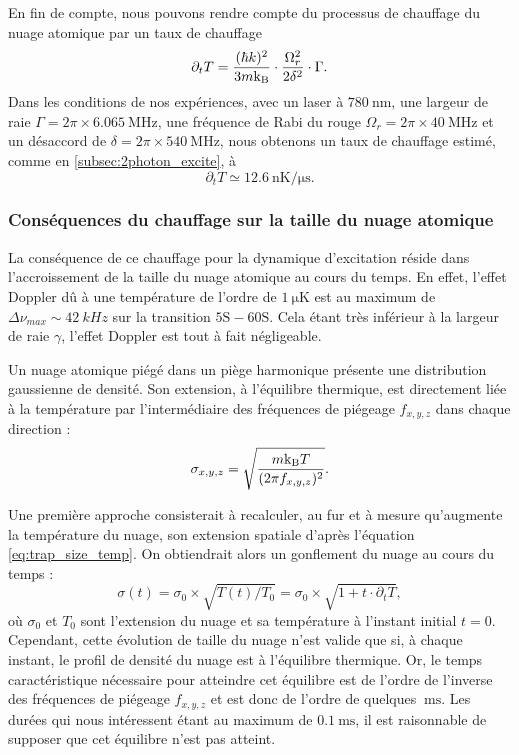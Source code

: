 En fin de compte, nous pouvons rendre compte du processus de chauffage du nuage atomique par un taux de chauffage
\begin{equation}
\label{eq:heating_rate}
\partial_t T = \frac{(\hbar k)^2}{3m\mathrm{k_B}} \cdot \frac{\Omega_r^2}{2\delta^2} \cdot \Gamma.
\end{equation}
Dans les conditions de nos expériences, avec un laser à $\SI{780}{\nano\meter}$, une largeur de raie $\Gamma = 2\pi\times \SI{6.065}{\MHz}$, une fréquence de Rabi du rouge $\Omega_r = 2\pi\times \SI{40}{\MHz}$ et un désaccord de $\delta = 2\pi \times \SI{540}{\MHz}$, nous obtenons un taux de chauffage estimé, comme en \ref{subsec:2photon_excite}, à
\begin{equation}
\label{heating_rate_value}
\partial_t T \simeq \SI{12.6}{\nano\K / \micro\second}.
\end{equation}

\subsubsection*{Conséquences du chauffage sur la taille du nuage atomique}
\noindent La conséquence de ce chauffage pour la dynamique d'excitation réside dans l'accroissement de la taille du nuage atomique au cours du temps.
En effet, l'effet Doppler dû à une température de l'ordre de $\SI{1}{\micro\kelvin}$ est au maximum de $\Delta \nu_{max} \sim \SI{42}{kHz}$ sur la transition $\mathrm{5S-60S}$.
Cela étant très inférieur à la largeur de raie $\gamma$, l'effet Doppler est tout à fait négligeable. %

Un nuage atomique piégé dans un piège harmonique présente une distribution gaussienne de densité.
Son extension, à l'équilibre thermique, est directement liée à la température par l'intermédiaire des fréquences de piégeage $f_{x,y,z}$ dans chaque direction :
\begin{equation}
\label{eq:trap_size_temp}
\sigma_{x,y,z} = \sqrt{\frac{m\mathrm{k_B} T}{(2\pi f_{x,y,z})^2}}.
\end{equation}

Une première approche consisterait à recalculer, au fur et à mesure qu'augmente la température du nuage, son extension spatiale d'après l'équation \eqref{eq:trap_size_temp}.
On obtiendrait alors un gonflement du nuage au cours du temps :
\begin{equation}
\label{eq:bigsigma_t}
\sigma(t) = \sigma_0\times\sqrt{T(t)/T_0} = \sigma_0\times\sqrt{1+t\cdot\partial_t T},
\end{equation}
où $\sigma_0$ et $T_0$ sont l'extension du nuage et sa température à l'instant initial $t=0$.
Cependant, cette évolution de taille du nuage n'est valide que si, à chaque instant, le profil de densité du nuage est à l'équilibre thermique.
Or, le temps caractéristique nécessaire pour atteindre cet équilibre est de l'ordre de l'inverse des fréquences de piégeage $f_{x,y,z}$ et est donc de l'ordre de quelques $\SI{}{\ms}$.
Les durées qui nous intéressent étant au maximum de $\SI{0.1}{\ms}$, il est raisonnable de supposer que cet équilibre n'est pas atteint.

